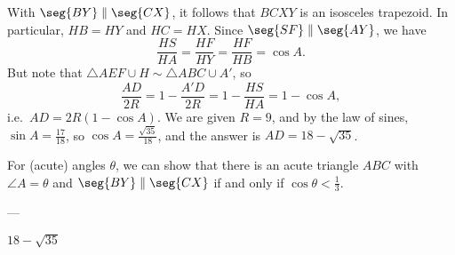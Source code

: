 With $\seg{BY}\parallel\seg{CX}$, it follows that $BCXY$ is an isosceles trapezoid. In particular, $HB=HY$ and $HC=HX$. Since $\seg{SF}\parallel\seg{AY}$, we have \[\frac{HS}{HA}=\frac{HF}{HY}=\frac{HF}{HB}=\cos A.\]
But note that $\triangle AEF\cup H\sim\triangle ABC\cup A'$, so \[\frac{AD}{2R}=1-\frac{A'D}{2R}=1-\frac{HS}{HA}=1-\cos A,\]
i.e.\ $AD=2R(1-\cos A)$. We are given $R=9$, and by the law of sines, $\sin A=\frac{17}{18}$, so $\cos A=\frac{\sqrt{35}}{18}$, and the answer is $AD=18-\sqrt{35}$.
\begin{remark}
    For (acute) angles $\theta$, we can show that there is an acute triangle $ABC$ with $\angle A=\theta$ and $\seg{BY}\parallel\seg{CX}$ if and only if $\cos\theta<\frac13$.
\end{remark}

---

$18-\sqrt{35}$
